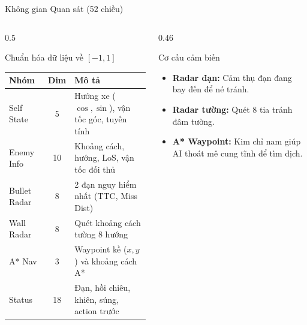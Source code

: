 \documentclass[aspectratio=169]{beamer}
\begin{document}
\begin{frame}{Không gian Quan sát (52 chiều)}
  \begin{columns}[T]
    \begin{column}{0.5\textwidth}
      \begin{block}{Chuẩn hóa dữ liệu về $[-1, 1]$}
        \scriptsize
        \renewcommand{\arraystretch}{1.1}
        \begin{tabular}{l c p{4.4cm}}
          \toprule
          \textbf{Nhóm} & \textbf{Dim} & \textbf{Mô tả} \\
          \midrule
          Self State & 5 & Hướng xe ($\cos,\sin$), vận tốc góc, tuyến tính \\
          Enemy Info & 10 & Khoảng cách, hướng, LoS, vận tốc đối thủ \\
          Bullet Radar & 8 & 2 đạn nguy hiểm nhất (TTC, Miss Dist) \\
          Wall Radar & 8 & Quét khoảng cách tường 8 hướng \\
          \rowcolor{hustyellow!20}
          A* Nav & 3 & Waypoint kề ($x,y$) và khoảng cách A* \\
          Status & 18 & Đạn, hồi chiêu, khiên, súng, action trước \\
          \bottomrule
        \end{tabular}
      \end{block}
    \end{column}
    \begin{column}{0.46\textwidth}
      \begin{exampleblock}{Cơ cấu cảm biến}
        \small
        \begin{itemize}
          \item \textbf{Radar đạn:} Cảm thụ đạn đang bay đến để né tránh.
          \item \textbf{Radar tường:} Quét 8 tia tránh đâm tường.
          \item \textbf{A* Waypoint:} Kim chỉ nam giúp AI thoát mê cung tĩnh để tìm địch.
        \end{itemize}
      \end{exampleblock}
    \end{column}
  \end{columns}
\end{frame}
\end{document}
